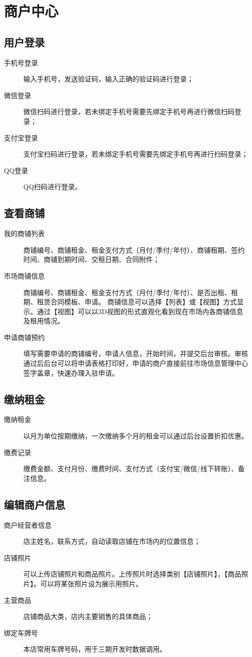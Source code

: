 \documentclass[12pt,a4paper,openany]{ctexrep}
\begin{document}
\section{商户中心}
\subsection{用户登录}
\begin{description}
\item[手机号登录]输入手机号，发送验证码，输入正确的验证码进行登录；
\item[微信登录]微信扫码进行登录，若未绑定手机号需要先绑定手机号再进行微信扫码登录；
\item[支付宝登录]支付宝扫码进行登录，若未绑定手机号需要先绑定手机号再进行扫码登录；
\item[QQ登录]QQ扫码进行登录。
\end{description}

\subsection{查看商铺}
\begin{description}
\item[我的商铺列表]商铺编号、商铺租金、租金支付方式（月付/季付/年付）、商铺租期、签约时间、商铺到期时间、交租日期、合同附件；
\item[市场商铺信息]商铺编号、商铺租金、租金支付方式（月付/季付/年付）、是否出租、租期、租赁合同模板、申请。
商铺信息可以选择【列表】或【视图】方式显示。通过【视图】可以以3D视图的形式直观化看到现在市场内各商铺信息及租用情况。
\item[申请商铺预约]填写需要申请的商铺编号，申请人信息，开始时间，并提交后台审核。审核通过后后台可以将申请表格打印好，申请的商户直接前往市场信息管理中心签字盖章，快速办理入驻申请。
\end{description}

\subsection{缴纳租金}
\begin{description}
\item[缴纳租金]以月为单位按期缴纳，一次缴纳多个月的租金可以通过后台设置折扣优惠。
\item[缴费记录]缴费金额、支付月份、缴费时间、支付方式（支付宝/微信/线下转账）、备注信息。
\end{description}

\subsection{编辑商户信息}
\begin{description}
\item[商户经营者信息]店主姓名，联系方式，自动读取店铺在市场内的位置信息；
\item[店铺照片]可以上传店铺照片和商品照片。上传照片时选择类别【店铺照片】，【商品照片】。可以将某张照片设为展示用照片\label{shop_cover}。
\item[主营商品]店铺商品大类，店内主要销售的具体商品\label{main_business}；
\item[绑定车牌号]本店常用车牌号码，用于三期开发时数据调用。
\end{description}
\end{document}
